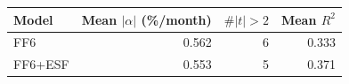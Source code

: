\begin{tabular}{lrrr}
\toprule
Model & Mean $|\alpha|$ (\%/month) & $\#|t|>2$ & Mean $R^2$ \\
\midrule
FF6 & 0.562 & 6 & 0.333 \\
FF6+ESF & 0.553 & 5 & 0.371 \\
\bottomrule
\end{tabular}